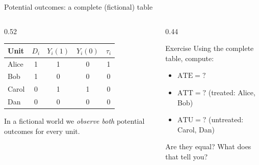 \documentclass[aspectratio=169, 10pt]{beamer}
\begin{document}
\begin{frame}{Potential outcomes: a complete (fictional) table}

  \begin{columns}[T]
    \begin{column}{0.52\textwidth}
      \begin{tabular}{lcccc}
        \toprule
        Unit & $D_i$ & $Y_i(1)$ & $Y_i(0)$ & $\tau_i$ \\
        \midrule
        Alice  & 1 & 1 & 0 & \phantom{$-$}1 \\
        Bob    & 1 & 0 & 0 & \phantom{$-$}0 \\
        Carol  & 0 & 1 & 1 & \phantom{$-$}0 \\
        Dan    & 0 & 0 & 0 & \phantom{$-$}0 \\
        \bottomrule
      \end{tabular}

      \vspace{3mm}
      \small In a fictional world we \emph{observe both} potential outcomes for every unit.
    \end{column}
    \begin{column}{0.44\textwidth}
      \begin{exampleblock}{Exercise}
        Using the complete table, compute:
        \begin{itemize}
          \item $\text{ATE} = ?$
          \item $\text{ATT} = ?$ \hfill (treated: Alice, Bob)
          \item $\text{ATU} = ?$ \hfill (untreated: Carol, Dan)
        \end{itemize}
        \vspace{2mm}
        \small Are they equal? What does that tell you?
      \end{exampleblock}
    \end{column}
  \end{columns}
\end{frame}

\end{document}
